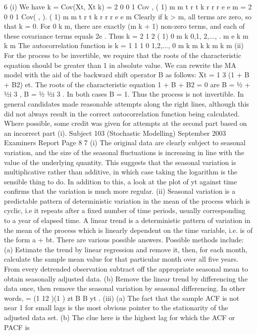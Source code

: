 \documentclass[a4paper,12pt]{article}
\begin{document}
\begin{enumerate}
6 (i) We have
k = Cov(Xt, Xt k) = 2
0 0
1
Cov ,
( 1)
m m
t r t k r
r r
e e
m
= 2
0 0
1
Cov( , ).
( 1)
m m
t r t k r
r r
e e
m
Clearly if k > m, all terms are zero, so that k = 0.
For 0 k m, there are exactly (m k + 1) non-zero terms, and each of these
covariance terms equals 2e . Thus
k =
2
1 2
( 1)
0
m k 0,1, 2,..., .
m e
k m
k m
The autocorrelation function is
k = 1
1
1 0
1,2,...,
0
m k
m
k
k m
k m
(ii) For the process to be invertible, we require that the roots of the characteristic
equation should be greater than 1 in absolute value.
We can rewrite the MA model with the aid of the backward shift operator B as
follows:
Xt =
1
3
(1 + B + B2) et.
The roots of the characteristic equation
1 + B + B2 = 0
are B = ½ + ½i 3 , B = ½ ½i 3 .
In both cases B = 1. Thus the process is not invertible.
In general candidates made reasonable attempts along the right lines, although this did not always
result in the correct autocorrelation function being calculated. Where possible, some credit was
given for attempts at the second part based on an incorrect part (i).
Subject 103 (Stochastic Modelling) September 2003 Examiners Report
Page 8
7 (i) The original data are clearly subject to seasonal variation, and the size of the
seasonal fluctuations is increasing in line with the value of the underlying
quantity. This suggests that the seasonal variation is multiplicative rather than
additive, in which case taking the logarithm is the sensible thing to do. In
addition to this, a look at the plot of yt against time confirms that the variation
is much more regular.
(ii) Seasonal variation is a predictable pattern of deterministic variation in the
mean of the process which is cyclic, i.e it repeats after a fixed number of time
periods, usually corresponding to a year of elapsed time.
A linear trend is a deterministic pattern of variation in the mean of the process
which is linearly dependent on the time variable, i.e. is of the form a + bt.
There are various possible answers. Possible methods include:
(a) Estimate the trend by linear regression and remove it, then, for each
month, calculate the sample mean value for that particular month over
all five years. From every detrended observation subtract off the
appropriate seasonal mean to obtain seasonally adjusted data.
(b) Remove the linear trend by differencing the data once, then remove the
seasonal variation by seasonal differencing. In other words,
= (1 12 )(1 ) zt B B yt .
(iii) (a) The fact that the sample ACF is not near 1 for small lags is the most
obvious pointer to the stationarity of the adjusted data set.
(b) The clue here is the highest lag for which the ACF or PACF is

\end{enumerate}
\end{document}
